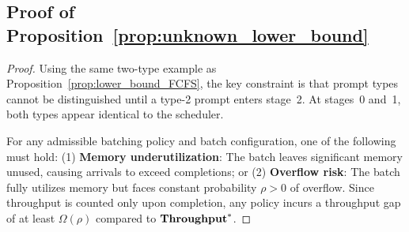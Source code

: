\subsection{Proof of Proposition~\ref{prop:unknown_lower_bound}}
\label{appendix:proof_unknown_lower_bound}

\begin{proof}
Using the same two-type example as Proposition~\ref{prop:lower_bound_FCFS}, the key constraint is that prompt types cannot be distinguished until a type-2 prompt enters stage~2. At stages~0 and~1, both types appear identical to the scheduler.

For any admissible batching policy and batch configuration, one of the following must hold: (1) \textbf{Memory underutilization}: The batch leaves significant memory unused, causing arrivals to exceed completions; or (2) \textbf{Overflow risk}: The batch fully utilizes memory but faces constant probability $\rho > 0$ of overflow. Since throughput is counted only upon completion, any policy incurs a throughput gap of at least $\Omega(\rho)$ compared to $\textbf{Throughput}^*$.
\end{proof}









